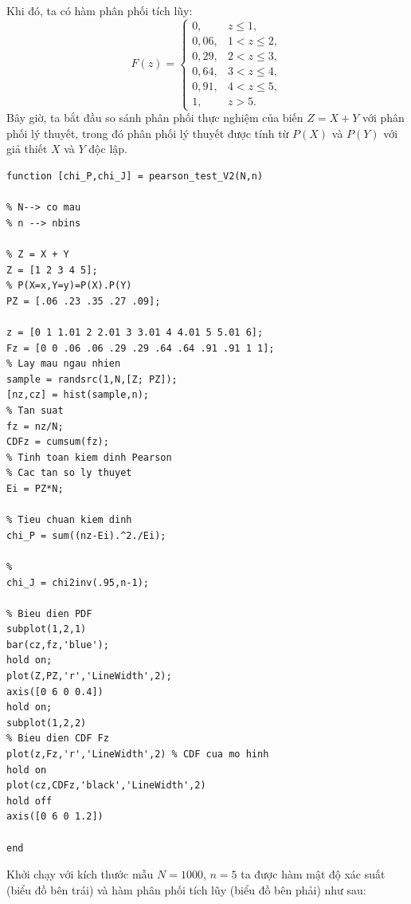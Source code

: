 Khi đó, ta có hàm phân phối tích lũy:
\[
F(z) =
\begin{cases}
0, & z \leq 1, \\
0,06, & 1 < z \leq 2, \\
0,29, & 2 < z \leq 3, \\
0,64, & 3 < z \leq 4, \\
0,91, & 4 < z \leq 5, \\
1, & z > 5.
\end{cases}
\]
Bây giờ, ta bắt đầu so sánh phân phối thực nghiệm của biến $Z = X + Y$  với phân phối lý thuyết, trong đó phân phối lý thuyết được tính từ \(P(X)\) và \(P(Y)\) với giả thiết \(X\) và \(Y\) độc lập.
\begin{matlab}
\begin{lstlisting}[caption={MATLAB code để kiểm định Pearson cho hai biến độc lập}]
function [chi_P,chi_J] = pearson_test_V2(N,n)

% N--> co mau
% n --> nbins

% Z = X + Y
Z = [1 2 3 4 5];
% P(X=x,Y=y)=P(X).P(Y)
PZ = [.06 .23 .35 .27 .09];

z = [0 1 1.01 2 2.01 3 3.01 4 4.01 5 5.01 6];
Fz = [0 0 .06 .06 .29 .29 .64 .64 .91 .91 1 1];
% Lay mau ngau nhien
sample = randsrc(1,N,[Z; PZ]);
[nz,cz] = hist(sample,n);
% Tan suat
fz = nz/N;
CDFz = cumsum(fz);
% Tinh toan kiem dinh Pearson
% Cac tan so ly thuyet
Ei = PZ*N;

% Tieu chuan kiem dinh
chi_P = sum((nz-Ei).^2./Ei);

%
chi_J = chi2inv(.95,n-1);

% Bieu dien PDF
subplot(1,2,1)
bar(cz,fz,'blue');
hold on;
plot(Z,PZ,'r','LineWidth',2);
axis([0 6 0 0.4])
hold on;
subplot(1,2,2)
% Bieu dien CDF Fz
plot(z,Fz,'r','LineWidth',2) % CDF cua mo hinh
hold on
plot(cz,CDFz,'black','LineWidth',2)
hold off
axis([0 6 0 1.2])

end
\end{lstlisting}
\end{matlab}
Khởi chạy với kích thước mẫu $N = 1000$, $n = 5$ ta được hàm mật độ xác suất (biểu đồ bên trái) và hàm phân phối tích lũy (biểu đồ bên phải) như sau:


